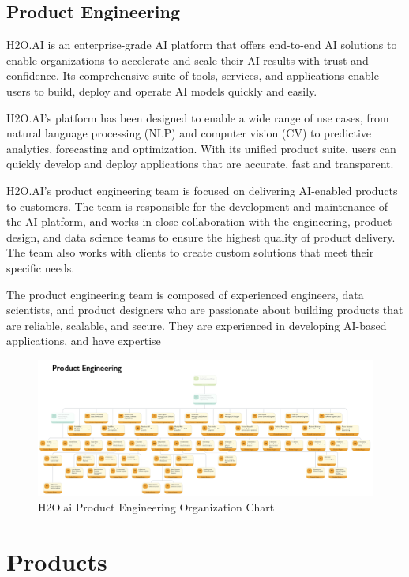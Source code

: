 \documentclass[12pt,a4paper]{report}
\begin{document}
\clearpage

\subsection{Product Engineering}
H2O.AI is an enterprise-grade \ac{AI} platform that offers end-to-end AI solutions to enable organizations to accelerate and scale their AI results with trust and confidence. Its comprehensive suite of tools, services, and applications enable users to build, deploy and operate AI models quickly and easily.

H2O.AI's platform has been designed to enable a wide range of use cases, from natural language processing (NLP) and computer vision (CV) to predictive analytics, forecasting and optimization. With its unified product suite, users can quickly develop and deploy applications that are accurate, fast and transparent.

H2O.AI's product engineering team is focused on delivering AI-enabled products to customers. The team is responsible for the development and maintenance of the AI platform, and works in close collaboration with the engineering, product design, and data science teams to ensure the highest quality of product delivery. The team also works with clients to create custom solutions that meet their specific needs.

The product engineering team is composed of experienced engineers, data scientists, and product designers who are passionate about building products that are reliable, scalable, and secure. They are experienced in developing AI-based applications, and have expertise

\begin{figure}[htbp]
 \centering
 \includegraphics[width=1\textwidth]{orgchart.png}
 \caption{H2O.ai Product Engineering Organization Chart}
 \end{figure}

\clearpage
\section{Products}
\end{document}
